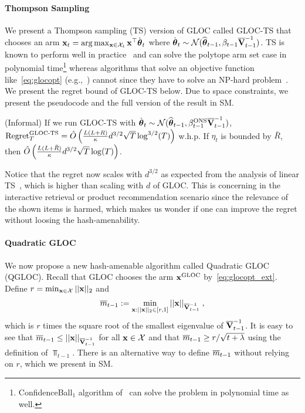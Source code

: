 \vspace{-6pt}
\paragraph{Thompson Sampling} 
%
We present a Thompson sampling (TS) version of GLOC called GLOC-TS that chooses an arm $\mathbf{x}_t = \arg \max_{\mathbf{x}\in\mathcal{X}_t} \mathbf{x}^{\top} \dot{{{\boldsymbol \theta}}}_t$ where $\dot{{{\boldsymbol \theta}}}_t \sim \mathcal{N}({{\widehat{\boldsymbol \theta}}}_{t-1}, \beta_{t-1}\overline{\mathbf{V}}^{-1}_{t-1})$.
TS is known to perform well in practice~\cite{chapelle11anempirical} and can solve the polytope arm set case in polynomial time\footnote{ConfidenceBall$_1$ algorithm of~\citet{dani08stochastic} can solve the problem in polynomial time as well.} whereas algorithms that solve an objective function like~\eqref{eq:glocopt} (e.g.,~\cite{ay11improved}) cannot since they have to solve an NP-hard problem~\cite{agrawal13thompson}.
We present the regret bound of GLOC-TS below. 
Due to space constraints, we present the pseudocode and the full version of the result in SM.
\begin{thm} (Informal) \label{thm:gloc-ts}
  If we run GLOC-TS with $\dot {{{\boldsymbol \theta}}}_t \sim \mathcal{N}({{\widehat{\boldsymbol \theta}}}_{t-1},\beta^{{\text{\normalfont ONS}}}_{t-1}\overline{\mathbf{V}}^{-1}_{t-1})$, $\normalfont{\text{Regret}}^{{\text{\normalfont GLOC-TS}}}_T = \hat O\left({ \frac{L(L+R)}{{\kappa}} } d^{3/2} \sqrt{T}\log^{3/2}(T)\right)$ w.h.p.
  If $\eta_t$ is bounded by $\bar R$, then $\hat O\left({ \frac{L(L+\bar R)}{{\kappa}} } d^{3/2} \sqrt{T}\log(T)\right)$.
\end{thm}
Notice that the regret now scales with $d^{3/2}$ as expected from the analysis of linear TS~\cite{agrawal14thompson}, which is higher than scaling with $d$ of GLOC.
This is concerning in the interactive retrieval or product recommendation scenario since the relevance of the shown items is harmed, which makes us wonder if one can improve the regret without loosing the hash-amenability.

\vspace{-6pt}
\paragraph{Quadratic GLOC} 
We now propose a new hash-amenable algorithm called Quadratic GLOC (QGLOC).
Recall that GLOC chooses the arm $\mathbf{x}^{{\text{\normalfont GLOC}}}$ by~\eqref{eq:glocopt_ext}.
Define $r = \min_{\mathbf{x}\in{\mathcal X}} ||\mathbf{x}||_2$ and 
\begin{equation}\begin{aligned} \label{def-m}
    \overline{m}_{t-1} := \min_{\mathbf{x}: ||\mathbf{x}||_2 \in [r,1]} ||\mathbf{x}||_{\overline{\mathbf{V}}^{-1}_{t-1}} \;,
\end{aligned}\end{equation}
which is $r$ times the square root of the smallest eigenvalue of $\overline{\mathbf{V}}^{-1}_{t-1}$.
It is easy to see that $\overline{m}_{t-1} \le ||\mathbf{x}||_{\overline{\mathbf{V}}^{-1}_{t-1}}$ for all $\mathbf{x}\in\mathcal{X}$ and that $\overline{m}_{t-1}\ge r/\sqrt{t+{\lambda}}$ using the definition of $\barV_{t-1}$.
There is an alternative way to define $\overline{m}_{t-1}$ without relying on $r$, which we present in SM.

